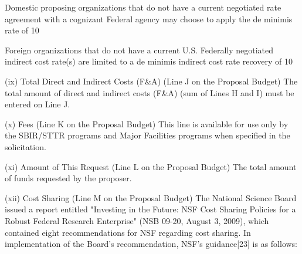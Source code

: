 {Domestic proposing organizations that do not have a current negotiated rate agreement with a cognizant Federal agency may choose to apply the de minimis rate of 10%

Foreign organizations that do not have a current U.S. Federally negotiated indirect cost rate(s) are limited to a de minimis indirect cost rate recovery of 10%

(ix) Total Direct and Indirect Costs (F&A) (Line J on the Proposal Budget)
The total amount of direct and indirect costs (F&A) (sum of Lines H and I) must be entered on Line J.

(x) Fees (Line K on the Proposal Budget)
This line is available for use only by the SBIR/STTR programs and Major Facilities programs when specified in the solicitation.

(xi) Amount of This Request (Line L on the Proposal Budget)
The total amount of funds requested by the proposer.

(xii) Cost Sharing (Line M on the Proposal Budget)
The National Science Board issued a report entitled "Investing in the Future: NSF Cost Sharing Policies for a Robust Federal Research Enterprise" (NSB 09-20, August 3, 2009), which contained eight recommendations for NSF regarding cost sharing. In implementation of the Board’s recommendation, NSF’s guidance[23] is as follows:

}
